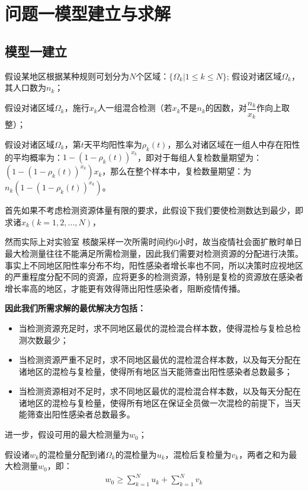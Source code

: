\documentclass[withoutpreface,bwprint]{cumcmthesis} %
\begin{document}
\section{问题一模型建立与求解}

\subsection{模型一建立}
假设某地区根据某种规则可划分为$N$个区域：$\{\Omega_k \vert 1\leq k \leq N \}$;
假设对诸区域$\Omega_k$，其人口数为$n_k$；

假设对诸区域$\Omega_k$，施行$x_k$人一组混合检测（若$x_k$不是$n_k$的因数，对$\dfrac{n_k}{x_k}$作向上取整）；

假设对诸区域$\Omega_k$，第$t$天平均阳性率为$\rho_k(t)$，那么对诸区域在一组人中存在阳性的平均概率为：$1-(1-\rho_k(t))^{x_k}$，即对于每组人复检数量期望为：$(1-(1-\rho_k(t))^{x_k})x_k$，那么在整个样本中，复检数量期望：为$n_k(1-(1-\rho_k(t))^{x_k})$。

首先如果不考虑检测资源体量有限的要求，此假设下我们要使检测数达到最少，即求诸$x_k(k=1,2,...,N)$，

然而实际上对实验室
核酸采样一次所需时间约6小时，故当疫情社会面扩散时单日最大检测量往往不能满足所需检测量，因此我们需要对检测资源的分配进行决策。事实上不同地区阳性率分布不均，阳性感染者增长率也不同，所以决策时应视地区的严重程度分配不同的资源，应将更多的检测资源，特别是复检的资源放在感染者增长率高的地区，才能更有效得筛出阳性感染者，阻断疫情传播。

\textbf{因此我们所需求解的最优解决方包括：}
\begin{itemize}
    \item 当检测资源充足时，求不同地区最优的混检混合样本数，使得混检与复检总检测次数最少；
    \item 当检测资源严重不足时，求不同地区最优的混检混合样本数，以及每天分配在诸地区的混检与复检量，使得所有地区当天能筛查出阳性感染者总数最多；
    \item 当检测资源相对不足时，求不同地区最优的混检混合样本数，以及每天分配在诸地区的混检与复检量，使得所有地区在保证全员做一次混检的前提下，当天能筛查出阳性感染者总数最多。
\end{itemize}

进一步，假设可用的最大检测量为$w_0$；

假设诸$w_k$的混检量分配到诸$\Omega_k$的混检量为$u_{k}$，混检后复检量为$v_{k}$，两者之和为最大检测量$w_0$，即：
\begin{align}
    w_0 \geqslant \sum^N_{k=1} u_k +\sum^N_{k=1} v_k
\end{align}
\end{document}
